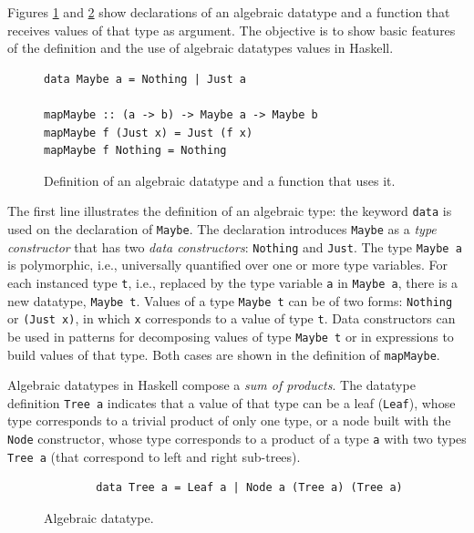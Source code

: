 \documentclass[oneside,12pt]{scrbook}
\theoremstyle{definition}
\theoremstyle{plain}
\theoremstyle{definition}
\begin{document}
Figures \ref{fig:haskellmaybe} and \ref{fig:haskelltree} show declarations of an algebraic datatype and a function that receives values of that type as argument. The objective is to show basic features of the definition and the use of algebraic datatypes values in Haskell.


\begin{figure}[h]
\begin{verbatim}
data Maybe a = Nothing | Just a

mapMaybe :: (a -> b) -> Maybe a -> Maybe b
mapMaybe f (Just x) = Just (f x)
mapMaybe f Nothing = Nothing
\end{verbatim}
	\caption{Definition of an algebraic datatype and a function that uses it.}
	\label{fig:haskellmaybe}
\end{figure}


The first line illustrates the definition of an algebraic type: the keyword \texttt{data} is used on the declaration of \texttt{Maybe}. The declaration introduces \texttt{Maybe} as a \emph{type constructor} that has two \emph{data constructors}: \texttt{Nothing} and \texttt{Just}. The type \texttt{Maybe a} is polymorphic, i.e., universally quantified over one or more type variables. For each instanced type \texttt{t}, i.e., replaced by the type variable \texttt{a} in \texttt{Maybe a}, there is a new datatype, \texttt{Maybe t}. Values of a type \texttt{Maybe t} can be of two forms: \texttt{Nothing} or \texttt{(Just x)}, in which \texttt{x} corresponds to a value of type \texttt{t}. Data constructors can be used in patterns for decomposing values of type \texttt{Maybe t} or in expressions to build values of that type. Both cases are shown in the definition of \texttt{mapMaybe}.

Algebraic datatypes in Haskell compose a \emph{sum of products}. The datatype definition \texttt{Tree a} indicates that a value of that type can be a leaf (\texttt{Leaf}), whose type corresponds to a trivial product of only one type, or a node built with the \texttt{Node} constructor, whose type corresponds to a product of a type \texttt{a} with two types \texttt{Tree a} (that correspond to left and right sub-trees).

\begin{center}
\begin{figure}[h]
	\begin{verbatim}
		data Tree a = Leaf a | Node a (Tree a) (Tree a)
	\end{verbatim}
	\caption{Algebraic datatype.}
	\label{fig:haskelltree}
\end{figure}
\end{center}
\end{document}
